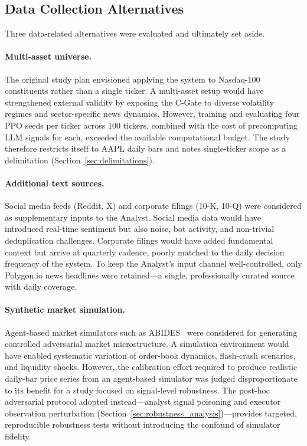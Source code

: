\subsection{Data Collection Alternatives}

Three data-related alternatives were evaluated and ultimately set aside.

\paragraph{Multi-asset universe.}
The original study plan envisioned applying the system to Nasdaq-100 constituents rather than a single ticker. A multi-asset setup would have strengthened external validity by exposing the C-Gate to diverse volatility regimes and sector-specific news dynamics. However, training and evaluating four PPO seeds per ticker across 100 tickers, combined with the cost of precomputing LLM signals for each, exceeded the available computational budget. The study therefore restricts itself to AAPL daily bars and notes single-ticker scope as a delimitation (Section~\ref{sec:delimitations}).

\paragraph{Additional text sources.}
Social media feeds (Reddit, X) and corporate filings (10-K, 10-Q) were considered as supplementary inputs to the Analyst. Social media data would have introduced real-time sentiment but also noise, bot activity, and non-trivial deduplication challenges. Corporate filings would have added fundamental context but arrive at quarterly cadence, poorly matched to the daily decision frequency of the system. To keep the Analyst's input channel well-controlled, only Polygon.io news headlines were retained---a single, professionally curated source with daily coverage.

\paragraph{Synthetic market simulation.}
Agent-based market simulators such as ABIDES~\cite{10.1145/3384441.3395986} were considered for generating controlled adversarial market microstructure. A simulation environment would have enabled systematic variation of order-book dynamics, flash-crash scenarios, and liquidity shocks. However, the calibration effort required to produce realistic daily-bar price series from an agent-based simulator was judged disproportionate to its benefit for a study focused on signal-level robustness. The post-hoc adversarial protocol adopted instead---analyst signal poisoning and executor observation perturbation (Section~\ref{sec:robustness_analysis})---provides targeted, reproducible robustness tests without introducing the confound of simulator fidelity.

